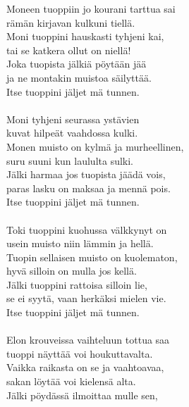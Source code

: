
        Moneen tuoppiin jo kourani tarttua sai \\
        rämän kirjavan kulkuni tiellä. \\
        Moni tuoppini hauskasti tyhjeni kai, \\
        tai se katkera ollut on niellä! \\
        Joka tuopista jälkiä pöytään jää \\
        ja ne montakin muistoa säilyttää. \\
        Itse tuoppini jäljet mä tunnen. \\
\hspace{10mm} \\
        Moni tyhjeni seurassa ystävien \\
        kuvat hilpeät vaahdossa kulki. \\
        Monen muisto on kylmä ja murheellinen, \\
        suru suuni kun laululta sulki. \\
        Jälki harmaa jos tuopista jäädä vois, \\
        paras lasku on maksaa ja mennä pois. \\
        Itse tuoppini jäljet mä tunnen. \\
\hspace{10mm} \\
        Toki tuoppini kuohussa välkkynyt on \\
        usein muisto niin lämmin ja hellä. \\
        Tuopin sellaisen muisto on kuolematon, \\
        hyvä silloin on mulla jos kellä. \\
        Jälki tuoppini rattoisa silloin lie, \\
        se ei syytä, vaan herkäksi mielen vie. \\
        Itse tuoppini jäljet mä tunnen. \\
\hspace{10mm} \\
        Elon krouveissa vaihteluun tottua saa \\
        tuoppi näyttää voi houkuttavalta. \\
        Vaikka raikasta on se ja vaahtoavaa, \\
        sakan löytää voi kielensä alta. \\
        Jälki pöydässä ilmoittaa mulle sen, \\
